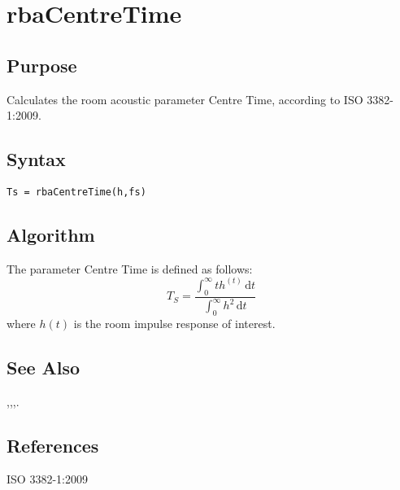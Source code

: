 
\chapter{rbaCentreTime} %
\label{cha:rbaCentreTime} %

\section{Purpose} %
\label{sec:rbaCentreTime_purpose}

Calculates the room acoustic parameter Centre Time, according to ISO 3382-1:2009.

\section{Syntax} %
\label{sec:rbaCentreTime_syntax}


\texttt{Ts = rbaCentreTime(h,fs)}


\section{Algorithm} %
\label{sec:rbaCentreTime_algorithm}

The parameter Centre Time is defined as follows:
\begin{equation}
	T_S = \frac{\int_{0}^{\infty} t h^(t) \,\mathrm{d} t}{\int_{0}^{\infty} h^2 \,\mathrm{d} t}
\end{equation}
where $h(t)$ is the room impulse response of interest.

\section{See Also} %
\label{sec:rbaCentreTime_see_also}

\texttt{},\quad \texttt{},\quad \texttt{},\quad \texttt{}.

\section{References} %
\label{sec:rbaCentreTime_references}

ISO 3382-1:2009


